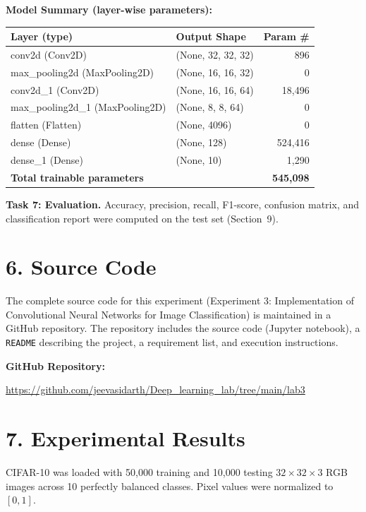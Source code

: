 \documentclass[11pt]{article}
\begin{document}
\textbf{Model Summary (layer-wise parameters):}
\begin{center}
\begin{tabular}{|l|l|r|}
\hline
Layer (type) & Output Shape & Param \# \\ \hline
conv2d (Conv2D) & (None, 32, 32, 32) & 896 \\ \hline
max\_pooling2d (MaxPooling2D) & (None, 16, 16, 32) & 0 \\ \hline
conv2d\_1 (Conv2D) & (None, 16, 16, 64) & 18{,}496 \\ \hline
max\_pooling2d\_1 (MaxPooling2D) & (None, 8, 8, 64) & 0 \\ \hline
flatten (Flatten) & (None, 4096) & 0 \\ \hline
dense (Dense) & (None, 128) & 524{,}416 \\ \hline
dense\_1 (Dense) & (None, 10) & 1{,}290 \\ \hline
\multicolumn{2}{|l|}{\textbf{Total trainable parameters}} & \textbf{545{,}098} \\ \hline
\end{tabular}
\end{center}

\vspace{2mm}
\textbf{Task 7: Evaluation.} Accuracy, precision, recall, F1-score, confusion matrix, and classification report were computed on the test set (Section~9).

\section*{6. Source Code}

The complete source code for this experiment (Experiment 3: Implementation of Convolutional Neural Networks for Image Classification) is maintained in a GitHub repository. The repository includes the source code (Jupyter notebook), a \texttt{README} describing the project, a requirement list, and execution instructions.

\noindent\textbf{GitHub Repository:}

\url{https://github.com/jeevasidarth/Deep_learning_lab/tree/main/lab3}

\section*{7. Experimental Results}

CIFAR-10 was loaded with 50{,}000 training and 10{,}000 testing $32\times32\times3$ RGB images across 10 perfectly balanced classes. Pixel values were normalized to $[0,1]$.
\end{document}
